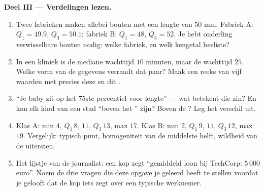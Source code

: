 \begin{problem}
\medskip
\noindent\textbf{Deel III --- Verdelingen lezen.}
\begin{enumerate}[resume]
  \item Twee fabrieken maken allebei bouten met een  lengte van
        $50$ mm. Fabriek A: $Q_1 = 49.9$, $Q_3 = 50.1$; fabriek B:
        $Q_1 = 48$, $Q_3 = 52$. Je hebt onderling verwisselbare bouten nodig:
        welke fabriek, en welk kengetal besliste?
  \item In een kliniek is de mediane wachttijd $10$ minuten, maar de
         wachttijd $25$. Welke vorm van de gegevens verraadt dat
        paar? Maak een reeks van vijf waarden met precies deze  en dit
        .
  \item ``Je baby zit op het 75ste percentiel voor lengte'' --- wat betekent
        die zin? En kan elk kind van een stad ``boven het '' zijn?
        Boven de ? Leg het verschil uit.
  \item Klas A: min $4$, $Q_1\,8$,  $11$, $Q_3\,13$, max $17$. Klas
        B: min $2$, $Q_1\,9$,  $11$, $Q_3\,12$, max $19$. Vergelijk:
        typisch punt, homogeniteit van de middelste helft, wildheid van de
        uitersten.
  \item Het lijstje van de journalist: een kop zegt ``gemiddeld loon bij
        TechCorp: $5\,000$ euro''. Noem de drie vragen die deze opgave je
        geleerd heeft te stellen voordat je gelooft dat de kop iets zegt over
        een typische werknemer.
\end{enumerate}


\end{problem}

